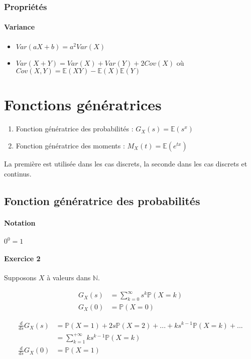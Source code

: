 \documentclass{article}
\begin{document}
\subsubsection{Propriétés}
\paragraph{Variance}
\begin{itemize}
  \item $ \textit{Var}(aX+b) = a^2\textit{Var}(X) $
  \item $ \textit{Var}(X+Y) = \textit{Var}(X) + \textit{Var}(Y) + 2\textit{Cov}(X)$
  où $ \textit{Cov}(X, Y) = \mathbb{E}(XY)-\mathbb{E}(X)\mathbb{E}(Y) $
\end{itemize}

\section{Fonctions génératrices}
\begin{enumerate}
  \item Fonction génératrice des probabilités : $ G_X(s) = \mathbb{E}(s^x) $
  \item Fonction génératrice des moments : $ M_X(t) = \mathbb{E}(e^{tx}) $
\end{enumerate}

La première est utilisée dans les cas discrets, la seconde dans les cas discrets et continus.

\subsection{Fonction génératrice des probabilités}
\paragraph{Notation} $0^0 = 1$

\paragraph{Exercice 2} Supposons $X$ à valeurs dans $\mathbb{N}$.

\begin{align*}
  G_X(s) &= \sum_{k=0}^{\infty} s^k \mathbb{P}(X=k) \\
  G_X(0) &= \mathbb{P}(X=0)
\end{align*}

\begin{align*}
  \frac{d}{ds}G_X(s) &= \mathbb{P}(X=1) + 2s\mathbb{P}(X=2) + ... + ks^{k-1}\mathbb{P}(X=k) + ... \\
  &= \sum_{k=1}^{+ \infty} ks^{k-1}\mathbb{P}(X=k) \\
  \frac{d}{ds}G_X(0) &= \mathbb{P}(X=1)
\end{align*}
\end{document}
